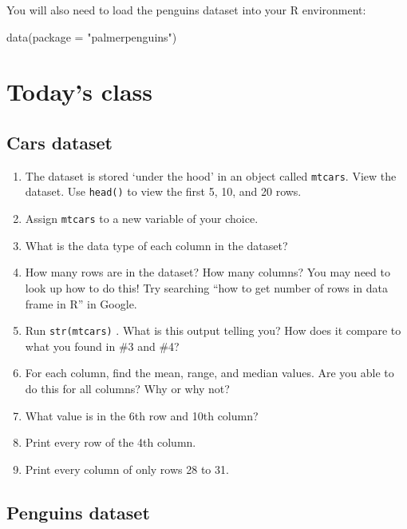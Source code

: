 \documentclass[
  letterpaper,
  DIV=11,
  numbers=noendperiod]{scrreprt}
\newenvironment{Shaded}{\begin{snugshade}}{\end{snugshade}}
\newcommand{\AttributeTok}[1]{\textcolor[rgb]{0.40,0.45,0.13}{#1}}
\newcommand{\FunctionTok}[1]{\textcolor[rgb]{0.28,0.35,0.67}{#1}}
\newcommand{\NormalTok}[1]{\textcolor[rgb]{0.00,0.23,0.31}{#1}}
\newcommand{\StringTok}[1]{\textcolor[rgb]{0.13,0.47,0.30}{#1}}
\providecommand{\tightlist}{%
  \setlength{\itemsep}{0pt}\setlength{\parskip}{0pt}}\usepackage{longtable,booktabs,array}
\begin{document}
You will also need to load the penguins dataset into your R environment:

\begin{Shaded}
\begin{Highlighting}[]
\FunctionTok{data}\NormalTok{(}\AttributeTok{package =} \StringTok{"palmerpenguins"}\NormalTok{)}
\end{Highlighting}
\end{Shaded}

\hypertarget{todays-class}{%
\section{Today's class}\label{todays-class}}

\hypertarget{cars-dataset}{%
\subsection{Cars dataset}\label{cars-dataset}}

\begin{enumerate}
\def\labelenumi{\arabic{enumi}.}
\tightlist
\item
  The dataset is stored `under the hood' in an object called
  \texttt{mtcars}. View the dataset. Use \texttt{head()} to view the
  first 5, 10, and 20 rows.
\item
  Assign \texttt{mtcars} to a new variable of your choice.
\item
  What is the data type of each column in the dataset?
\item
  How many rows are in the dataset? How many columns? You may need to
  look up how to do this! Try searching ``how to get number of rows in
  data frame in R'' in Google.
\item
  Run \texttt{str(mtcars)} . What is this output telling you? How does
  it compare to what you found in \#3 and \#4?
\item
  For each column, find the mean, range, and median values. Are you able
  to do this for all columns? Why or why not?
\item
  What value is in the 6th row and 10th column?
\item
  Print every row of the 4th column.
\item
  Print every column of only rows 28 to 31.
\end{enumerate}

\hypertarget{penguins-dataset}{%
\subsection{Penguins dataset}\label{penguins-dataset}}
\end{document}
